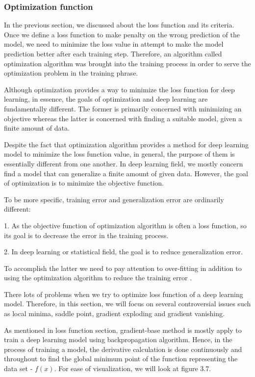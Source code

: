 \subsubsection{Optimization function}
\label{subsubsection:optimfunc}
\noindent

	In the previous section, we discussed about the loss function and its criteria. Once we define a loss function to make penalty on the wrong prediction of the model, we need to minimize the loss value in attempt to make the model prediction better after each training step. Therefore, an algorithm called optimization algorithm was brought into the training process in order to serve the optimization problem in the training phrase.
	
	Although optimization provides a way to minimize the loss function for deep learning, in essence, the goals of optimization and deep learning are fundamentally different. The former is primarily concerned with minimizing an objective whereas the latter is concerned with finding a suitable model, given a finite amount of data.
	
	Despite the fact that optimization algorithm provides a method for deep learning model to minimize the loss function value, in general, the purpose of them is essentially different from one another. In deep learning field, we mostly concern find a model that can generalize a finite amount of given data. However, the goal of optimization is to minimize the objective function.
	
	To be more specific, training error and generalization error are ordinarily different:

	1. As the objective function of optimization algorithm is often a loss function, so its goal is to decrease the error in the training process.

	2. In deep learning or statistical field, the goal is to reduce generalization error.

	To accomplish the latter we need to pay attention to over-fitting in addition to using the optimization algorithm to reduce the training error \cite{dive2dl}.
	
	There lots of problems when we try to optimize loss function of a deep learning model. Therefore, in this section, we will focus on several controversial issues such as local minima, saddle point, gradient exploding and gradient vanishing.
	
	As mentioned in loss function section, gradient-base method is mostly apply to train a deep learning model using backpropagation algorithm. Hence, in the process of training a model, the derivative calculation is done continuously and throughout to find the global minimum point of the function representing the data set - $ f (x) $. For ease of visualization, we will look at figure 3.7.
	
